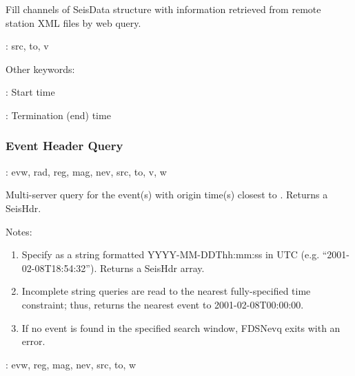 \documentclass[letterpaper,11pt,english]{sphinxmanual}
\begin{document}
Fill channels  of SeisData structure  with information retrieved from
remote station XML files by web query.

\begin{DUlineblock}{0em}
\item[] {\hyperref[\detokenize{src/Appendices/keywords:dkw}]{}}: src, to, v
\item[] Other keywords:
\item[] : Start time
\item[] : Termination (end) time
\end{DUlineblock}


\subsubsection{Event Header Query}
\label{\detokenize{src/Web/webclients:event-header-query}}

\begin{fulllineitems}
\end{fulllineitems}


{\hyperref[\detokenize{src/Appendices/keywords:dkw}]{}}: evw, rad, reg, mag, nev, src, to, v, w

Multi-server query for the event(s) with origin time(s) closest to . Returns
a SeisHdr.

Notes:
\begin{enumerate}
\def\theenumi{\arabic{enumi}}
\def\labelenumi{\theenumi .}
\makeatletter\def\p@enumii{\p@enumi \theenumi .}\makeatother
\item {} 
Specify  as a string formatted YYYY-MM-DDThh:mm:ss in UTC (e.g. “2001-02-08T18:54:32”). Returns a SeisHdr array.

\item {} 
Incomplete string queries are read to the nearest fully-specified time constraint; thus,  returns the nearest event to 2001-02-08T00:00:00.

\item {} 
If no event is found in the specified search window, FDSNevq exits with an error.

\end{enumerate}

\begin{DUlineblock}{0em}
\item[] {\hyperref[\detokenize{src/Appendices/keywords:dkw}]{}}: evw, reg, mag, nev, src, to, w
\end{DUlineblock}
\end{document}
